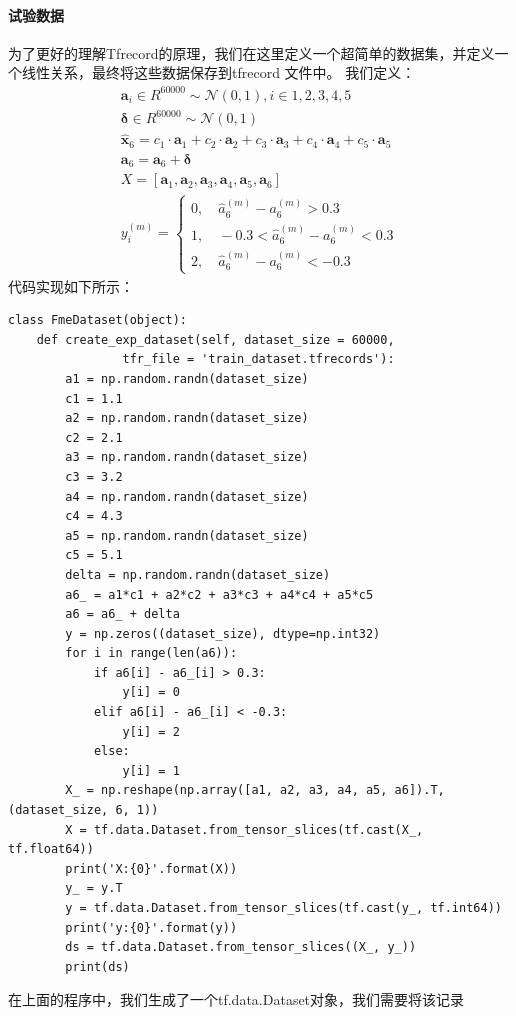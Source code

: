\documentclass{article}
\begin{document}
\paragraph{试验数据}
为了更好的理解Tfrecord的原理，我们在这里定义一个超简单的数据集，并定义一个线性关系，最终将这些数据保存到tfrecord
文件中。
我们定义：
\begin{equation}
\begin{aligned}
\boldsymbol{a}_i \in R^{60000} \sim \mathcal{N}(0, 1), i \in {1, 2, 3, 4, 5} \\
\boldsymbol{\delta} \in R^{60000} \sim \mathcal{N}(0, 1) \\
\hat{\boldsymbol{x}}_6 = c_1 \cdot \boldsymbol{a}_1 + c_2 \cdot \boldsymbol{a}_2 + 
c_3 \cdot \boldsymbol{a}_3 + c_4 \cdot \boldsymbol{a}_4 + c_5 \cdot \boldsymbol{a}_5 \\
\boldsymbol{a}_6 = \boldsymbol{a}_6 + \boldsymbol{\delta} \\
X = [\boldsymbol{a}_1, \boldsymbol{a}_2, \boldsymbol{a}_3, \boldsymbol{a}_4, 
    \boldsymbol{a}_5, \boldsymbol{a}_6] \\
y^{(m)}_{i} = \begin{cases}
    0, \quad \hat{a}^{(m)}_6 - a^{(m)}_6 > 0.3 \\
    1, \quad -0.3 < \hat{a}^{(m)}_6 - a^{(m)}_6 < 0.3 \\
    2, \quad \hat{a}^{(m)}_6 - a^{(m)}_6 < -0.3
\end{cases}
\end{aligned}
\label{e000121}
\end{equation}
代码实现如下所示：
\begin{lstlisting}
class FmeDataset(object):
    def create_exp_dataset(self, dataset_size = 60000, 
                tfr_file = 'train_dataset.tfrecords'):
        a1 = np.random.randn(dataset_size)
        c1 = 1.1
        a2 = np.random.randn(dataset_size)
        c2 = 2.1
        a3 = np.random.randn(dataset_size)
        c3 = 3.2
        a4 = np.random.randn(dataset_size)
        c4 = 4.3
        a5 = np.random.randn(dataset_size)
        c5 = 5.1
        delta = np.random.randn(dataset_size)
        a6_ = a1*c1 + a2*c2 + a3*c3 + a4*c4 + a5*c5
        a6 = a6_ + delta
        y = np.zeros((dataset_size), dtype=np.int32)
        for i in range(len(a6)):
            if a6[i] - a6_[i] > 0.3:
                y[i] = 0
            elif a6[i] - a6_[i] < -0.3:
                y[i] = 2
            else:
                y[i] = 1
        X_ = np.reshape(np.array([a1, a2, a3, a4, a5, a6]).T, (dataset_size, 6, 1))
        X = tf.data.Dataset.from_tensor_slices(tf.cast(X_, tf.float64))
        print('X:{0}'.format(X))
        y_ = y.T
        y = tf.data.Dataset.from_tensor_slices(tf.cast(y_, tf.int64))
        print('y:{0}'.format(y))
        ds = tf.data.Dataset.from_tensor_slices((X_, y_))
        print(ds)
\end{lstlisting}
在上面的程序中，我们生成了一个tf.data.Dataset对象，我们需要将该记录
\end{document}
